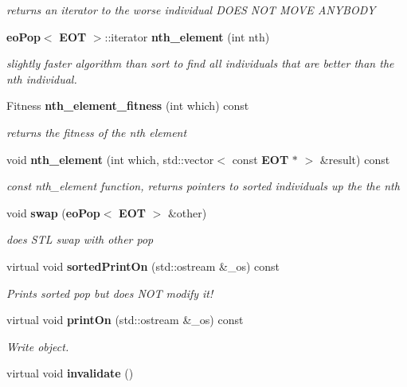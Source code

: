 \begin{CompactItemize}
\begin{CompactList}\small\item\em returns an iterator to the worse individual DOES NOT MOVE ANYBODY \item\end{CompactList}\item 
{\bf eo\-Pop}$<$ {\bf EOT} $>$::iterator {\bf nth\_\-element} (int nth)
\begin{CompactList}\small\item\em slightly faster algorithm than sort to find all individuals that are better than the nth individual. \item\end{CompactList}\item 
Fitness {\bf nth\_\-element\_\-fitness} (int which) const \label{classeo_pop_a14}

\begin{CompactList}\small\item\em returns the fitness of the nth element \item\end{CompactList}\item 
void {\bf nth\_\-element} (int which, std::vector$<$ const {\bf EOT} $\ast$ $>$ \&result) const \label{classeo_pop_a15}

\begin{CompactList}\small\item\em const nth\_\-element function, returns pointers to sorted individuals up the the nth \item\end{CompactList}\item 
void {\bf swap} ({\bf eo\-Pop}$<$ {\bf EOT} $>$ \&other)\label{classeo_pop_a16}

\begin{CompactList}\small\item\em does STL swap with other pop \item\end{CompactList}\item 
virtual void {\bf sorted\-Print\-On} (std::ostream \&\_\-os) const 
\begin{CompactList}\small\item\em Prints sorted pop but does NOT modify it! \item\end{CompactList}\item 
virtual void {\bf print\-On} (std::ostream \&\_\-os) const 
\begin{CompactList}\small\item\em Write object. \item\end{CompactList}\item 
virtual void {\bf invalidate} ()\label{classeo_pop_a19}


\end{CompactItemize}
